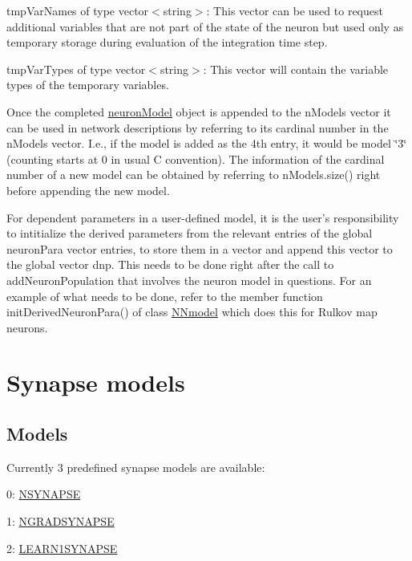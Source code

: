 \begin{DoxyItemize}
\item {\ttfamily tmp\+Var\+Names} of type {\ttfamily vector$<$string$>$}\+: This vector can be used to request additional variables that are not part of the state of the neuron but used only as temporary storage during evaluation of the integration time step.
\item {\ttfamily tmp\+Var\+Types} of type {\ttfamily vector$<$string$>$}\+: This vector will contain the variable types of the temporary variables.
\end{DoxyItemize}

Once the completed {\ttfamily \hyperlink{structneuronModel}{neuron\+Model}} object is appended to the {\ttfamily n\+Models} vector it can be used in network descriptions by referring to its cardinal number in the n\+Models vector. I.\+e., if the model is added as the 4th entry, it would be model \char`\"{}3\char`\"{} (counting starts at 0 in usual C convention). The information of the cardinal number of a new model can be obtained by referring to {\ttfamily n\+Models.\+size()} right before appending the new model.

For dependent parameters in a user-\/defined model, it is the user's responsibility to intitialize the derived parameters from the relevant entries of the global {\ttfamily neuron\+Para} vector entries, to store them in a vector and append this vector to the global vector {\ttfamily dnp}. This needs to be done right after the call to add\+Neuron\+Population that involves the neuron model in questions. For an example of what needs to be done, refer to the member function {\ttfamily init\+Derived\+Neuron\+Para()} of class {\ttfamily \hyperlink{classNNmodel}{N\+Nmodel}} which does this for Rulkov map neurons. \hypertarget{sect3}{}\section{Synapse models}\label{sect3}
\hypertarget{sect3_subsect31}{}\subsection{Models}\label{sect3_subsect31}
Currently 3 predefined synapse models are available\+:
\begin{DoxyItemize}
\item 0\+: \hyperlink{sect3_sect31}{N\+S\+Y\+N\+A\+P\+S\+E}
\item 1\+: \hyperlink{sect3_sect32}{N\+G\+R\+A\+D\+S\+Y\+N\+A\+P\+S\+E}
\item 2\+: \hyperlink{sect3_sect33}{L\+E\+A\+R\+N1\+S\+Y\+N\+A\+P\+S\+E}
\end{DoxyItemize}